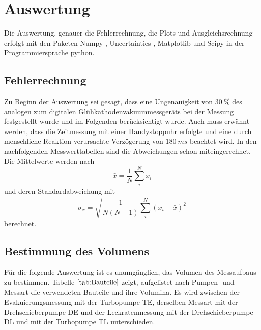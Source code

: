 \section{Auswertung}
Die Auswertung, genauer die Fehlerrechnung, die Plots und Ausgleichsrechnung erfolgt mit den Paketen
Numpy \cite{numpy}, Uncertainties \cite{uncertainties}, Matplotlib \cite{matplotlib} und Scipy \cite{scipy} in der Programmiersprache python.
\subsection{Fehlerrechnung}
Zu Beginn der Auswertung sei gesagt, dass eine Ungenauigkeit von $\SI{30}{\percent}$ des analogen zum digitalen Glühkathodenvakuummessgeräts
bei der Messung festgestellt wurde und im Folgenden berücksichtigt wurde.
Auch muss erwähnt werden, dass die Zeitmessung mit einer Handystoppuhr erfolgte und eine durch menschliche Reaktion verursachte
Verzögerung von $\SI{180}{ms}$ beachtet wird.\cite{reaktion}
In den nachfolgenden Messwerttabellen sind die Abweichungen schon miteingerechnet.\\
Die Mittelwerte werden nach
\begin{equation}
	\bar{x}=\frac{1}{N}\sum_{i}^N x_i
\end{equation}
und deren Standardabweichung mit
\begin{equation}
	\sigma_{\bar{x}} = \sqrt{\frac{1}{N(N-1)} \sum_{i}^N (x_i-\bar{x})^2}
\end{equation}
berechnet.
\subsection{Bestimmung des Volumens}
Für die folgende Auswertung ist es unumgänglich, das Volumen des Messaufbaus zu bestimmen.
Tabelle $\ref{tab:Bauteile}$ zeigt, aufgelistet nach Pumpen- und Messart die verwendeten Bauteile und ihre Volumina.
Es wird zwischen der Evakuierungsmessung mit der Turbopumpe TE, derselben Messart mit der Drehschieberpumpe DE und der Leckratenmessung
mit der Drehschieberpumpe DL und mit der Turbopumpe TL unterschieden.\newline

